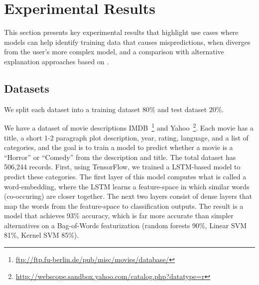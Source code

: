 \section{Experimental Results}
This section presents key experimental results  that highlight use cases where \sys models can help identify training data that causes mispredictions, 
when \sys diverges from the user's more complex model, and a comparison with alternative explanation approaches based on .

\subsection{Datasets}
We split each dataset into a training dataset $80\%$ and test dataset $20\%$. 

 We have a dataset of movie descriptions IMDB~\footnote{ \url{ftp://ftp.fu-berlin.de/pub/misc/movies/database/}} and Yahoo~\footnote{ \url{http://webscope.sandbox.yahoo.com/catalog.php?datatype=r}}.
Each movie has a title, a short 1-2 paragraph plot description, year, rating, language, and a list of categories, and the goal is to train a model to predict whether a movie is a ``Horror'' or ``Comedy'' from the description and title.  
The total dataset has 506,244 records.
First, using TensorFlow, we trained a LSTM-based model to predict these categories. The first layer of this model computes what is called a word-embedding, where the LSTM learns a feature-space in which similar words (co-occuring) are closer together. 
The next two layers consist of dense layers that map the words from the feature-space to classification outputs.
The result is a model that achieves 93\% accuracy, which is far more accurate than simpler alternatives on a Bag-of-Words featurization (random forests 90\%, Linear SVM 81\%, Kernel SVM 85\%).

